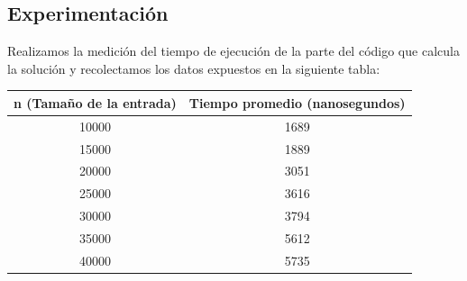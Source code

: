 \newpage
\subsection{Experimentación}
Realizamos la medición del tiempo de ejecución de la parte del código que calcula la solución y recolectamos los datos expuestos en la siguiente tabla:

\begin{table}[h!]
\centering
\label{my-label}
\begin{tabular}{cc}
\hline
\multicolumn{1}{|c|}{n (Tamaño de la entrada)} & \multicolumn{1}{c|}{Tiempo promedio (nanosegundos)}                                                                                                                                    \\ \hline
\multicolumn{1}{|c|}{10000}                        & \multicolumn{1}{c|}{1689}                                                                                                                                     \\ \hline
\multicolumn{1}{|c|}{15000}                        & \multicolumn{1}{c|}{1889}                                                                                                                                     \\ \hline
\multicolumn{1}{|c|}{20000}                        & \multicolumn{1}{c|}{3051}                                                                                                                                     \\ \hline
\multicolumn{1}{|c|}{25000}                        & \multicolumn{1}{c|}{3616}                                                                                                                                     \\ \hline
\multicolumn{1}{|c|}{30000}                        & \multicolumn{1}{c|}{3794}                                                                                                                                     \\ \hline
\multicolumn{1}{|c|}{35000}                        & \multicolumn{1}{c|}{5612}                                                                                                                                     \\ \hline
\multicolumn{1}{|c|}{40000}                        & \multicolumn{1}{c|}{5735}                                                                                                                                     \\ \hline

\end{tabular}
\end{table}
